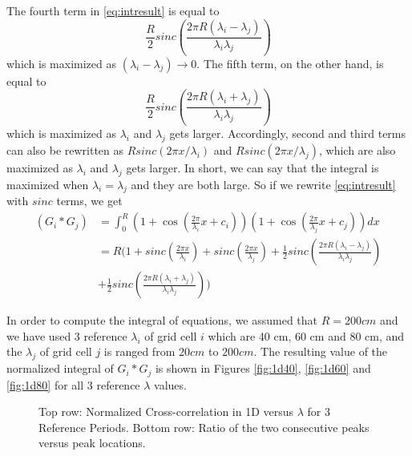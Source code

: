 \documentclass[11pt, letterpaper, onecolumn]{article}
\begin{document}
The fourth term in \eqref{eq:intresult} is equal to $$ \frac{R}{2} sinc(\frac{2 \pi R (\lambda_i - \lambda_j)}{\lambda_i \lambda_j}) $$ which is maximized as $ (\lambda_i - \lambda_j)\rightarrow 0 $. The fifth term, on the other hand, is equal to $$ \frac{R}{2} sinc(\frac{2 \pi R (\lambda_i + \lambda_j)}{\lambda_i \lambda_j}) $$ which is maximized as $ \lambda_i $ and $ \lambda_j $ gets larger. Accordingly, second and third terms can also be rewritten as $ R sinc(2 \pi x / \lambda_i) $ and $ R sinc(2 \pi x / \lambda_j)$,  which are also maximized as $ \lambda_i $ and $ \lambda_j $ gets larger. In short, we can say that the integral is maximized when $ \lambda_i = \lambda_j $ and they are both large.
So if we rewrite \eqref{eq:intresult} with $ sinc $ terms, we get
\begin{equation}
\begin{split}
    (G_i * G_j)
    & = \int_{0}^{R} (1 + \cos(\frac{2 \pi}{\lambda_i} x + c_i)) (1 + \cos(\frac{2 \pi}{\lambda_j} x + c_j)) dx \\
    & = R( 1 + sinc(\frac{2 \pi x }{\lambda_i}) + sinc(\frac{2 \pi x }{\lambda_j}) + \frac{1}{2} sinc(\frac{2 \pi R (\lambda_i - \lambda_j)}{\lambda_i \lambda_j}) \\
    & + \frac{1}{2} sinc(\frac{2 \pi R (\lambda_i + \lambda_j)}{\lambda_i \lambda_j}))
\label{eq:intresult2}
\end{split}
\end{equation}

In order to compute the integral of equations, we assumed that $ R = 200 cm $ and we have used 3 reference $ \lambda_i $ of grid cell $i$ which are 40 cm, 60 cm and 80 cm, and the $ \lambda_j $ of grid cell $j$ is ranged from $20cm$ to $200cm$. The resulting value of the normalized integral of $G_i * G_j$ is shown in Figures \ref{fig:1d40}, \ref{fig:1d60} and \ref{fig:1d80} for all 3 reference $ \lambda $ values.


\begin{figure}[!htbp]
\centering
{}
\caption{Top row: Normalized Cross-correlation in 1D versus $ \lambda $ for 3 Reference Periods. Bottom row: Ratio of the two consecutive peaks versus peak locations. }
\label{fig:1d}
\end{figure}
\end{document}
